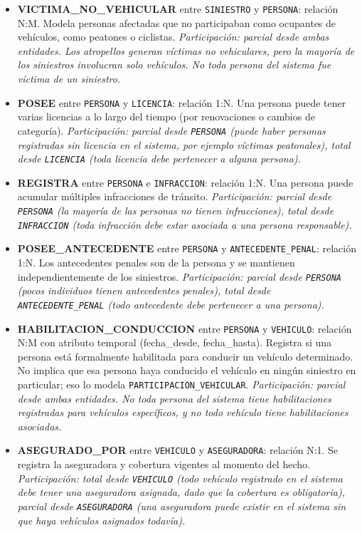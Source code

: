 \documentclass[12pt,a4paper]{article}
\begin{document}
\begin{itemize}[leftmargin=*]
    \item \textbf{VICTIMA\_NO\_VEHICULAR} entre \texttt{SINIESTRO} y \texttt{PERSONA}: relación N:M. Modela personas afectadas que no participaban como ocupantes de vehículos, como peatones o ciclistas. \emph{Participación: parcial desde ambas entidades. Los atropellos generan víctimas no vehiculares, pero la mayoría de los siniestros involucran solo vehículos. No toda persona del sistema fue víctima de un siniestro.}

    \item \textbf{POSEE} entre \texttt{PERSONA} y \texttt{LICENCIA}: relación 1:N. Una persona puede tener varias licencias a lo largo del tiempo (por renovaciones o cambios de categoría). \emph{Participación: parcial desde \texttt{PERSONA} (puede haber personas registradas sin licencia en el sistema, por ejemplo víctimas peatonales), total desde \texttt{LICENCIA} (toda licencia debe pertenecer a alguna persona).}

    \item \textbf{REGISTRA} entre \texttt{PERSONA} e \texttt{INFRACCION}: relación 1:N. Una persona puede acumular múltiples infracciones de tránsito. \emph{Participación: parcial desde \texttt{PERSONA} (la mayoría de las personas no tienen infracciones), total desde \texttt{INFRACCION} (toda infracción debe estar asociada a una persona responsable).}

    \item \textbf{POSEE\_ANTECEDENTE} entre \texttt{PERSONA} y \texttt{ANTECEDENTE\_PENAL}: relación 1:N. Los antecedentes penales son de la persona y se mantienen independientemente de los siniestros. \emph{Participación: parcial desde \texttt{PERSONA} (pocos individuos tienen antecedentes penales), total desde \texttt{ANTECEDENTE\_PENAL} (todo antecedente debe pertenecer a una persona).}

    \item \textbf{HABILITACION\_CONDUCCION} entre \texttt{PERSONA} y \texttt{VEHICULO}: relación N:M con atributo temporal (fecha\_desde, fecha\_hasta). Registra si una persona está formalmente habilitada para conducir un vehículo determinado. No implica que esa persona haya conducido el vehículo en ningún siniestro en particular; eso lo modela \texttt{PARTICIPACION\_VEHICULAR}. \emph{Participación: parcial desde ambas entidades. No toda persona del sistema tiene habilitaciones registradas para vehículos específicos, y no todo vehículo tiene habilitaciones asociadas.}

    \item \textbf{ASEGURADO\_POR} entre \texttt{VEHICULO} y \texttt{ASEGURADORA}: relación N:1. Se registra la aseguradora y cobertura vigentes al momento del hecho. \emph{Participación: total desde \texttt{VEHICULO} (todo vehículo registrado en el sistema debe tener una aseguradora asignada, dado que la cobertura es obligatoria), parcial desde \texttt{ASEGURADORA} (una aseguradora puede existir en el sistema sin que haya vehículos asignados todavía).}
\end{itemize}
\end{document}
